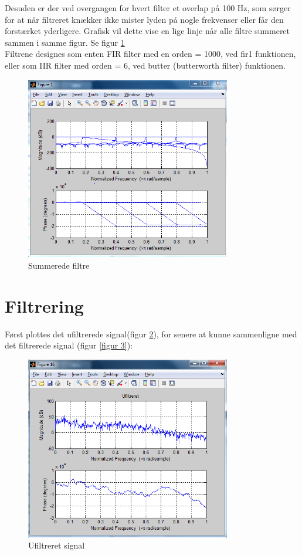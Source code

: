 Desuden er der ved overgangen for hvert filter et overlap på 100 Hz, som sørger for at når filtreret knækker ikke mister lyden på nogle frekvenser eller får den forstærket yderligere. Grafisk vil dette vise en lige linje når alle filtre summeret sammen i samme figur. Se figur \ref{Figur 1} \\
Filtrene designes som enten FIR filter med en orden = 1000, ved fir1 funktionen, eller som IIR filter med orden = 6, ved butter (butterworth filter) funktionen.
\begin{figure}[H]
	\centering
	\includegraphics[width=0.8\textwidth]{Figurer/Figur_1}
	\caption{Summerede filtre}
	\label{Figur 1}
\end{figure}

\section{Filtrering}
Først plottes det ufiltrerede signal(figur \ref{Figur 2}), for senere at kunne sammenligne med det filtrerede signal (figur \ref{figur 3}):

\begin{figure}[H]
	\centering
	\includegraphics[width=0.8\textwidth]{Figurer/Ufiltreret_signal}
	\caption{Ufiltreret signal}
	\label{Figur 2}
\end{figure}

